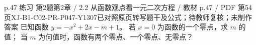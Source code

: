 \par\noindent\begin{minipage}{\linewidth}
\begin{bankitem}{p.47 练习 第2题}{第2章 / 2.2 从函数观点看一元二次方程 / 教材 p.47 / PDF 第54页}{XJ-B1-C02-PR-P047-Y1307}{已对照原页转写题干及公式；待教师复核；未制作答案}
已知函数 $y=-x^2+2x-m+1$。
若 $x=0$ 为函数的一个零点，求 $m$ 的值；
当 $m$ 为何值时，函数有两个零点、一个零点、无零点？
\end{bankitem}
\end{minipage}\par\medskip
